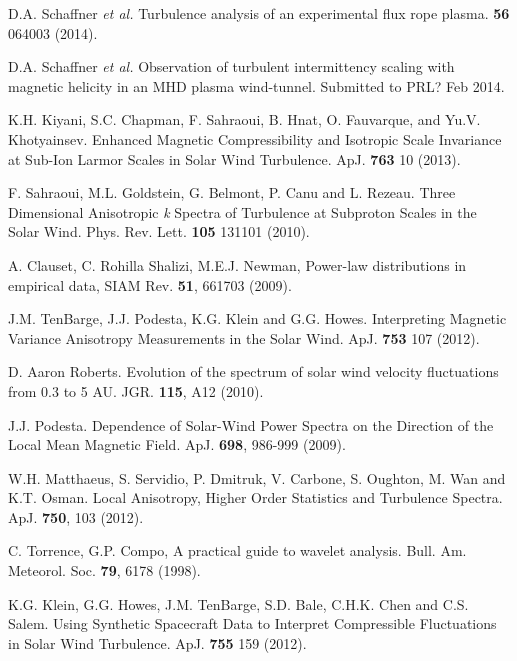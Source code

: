\documentclass[aip,prl,amsmath,amssymb,reprint,superscriptaddress]{revtex4-1} %
\begin{document}
\begin{thebibliography}{99}
 D.A. Schaffner {\it et al.} Turbulence analysis of an experimental flux rope plasma. {\bf 56} 064003 (2014).

 D.A. Schaffner {\it et al.} Observation of turbulent intermittency scaling with magnetic helicity in an MHD plasma wind-tunnel. Submitted to PRL? Feb 2014.

 K.H. Kiyani, S.C. Chapman, F. Sahraoui, B. Hnat, O. Fauvarque, and Yu.V. Khotyainsev. Enhanced Magnetic Compressibility and Isotropic Scale Invariance at Sub-Ion Larmor Scales in Solar Wind Turbulence. ApJ. {\bf 763} 10 (2013).

 F. Sahraoui, M.L. Goldstein, G. Belmont, P. Canu and L. Rezeau. Three Dimensional Anisotropic {\it k} Spectra of Turbulence at Subproton Scales in the Solar Wind. Phys. Rev. Lett. {\bf 105} 131101 (2010).

A. Clauset, C. Rohilla Shalizi, M.E.J. Newman, Power-law distributions in empirical data, SIAM Rev. {\bf 51}, 661703 (2009).

 J.M. TenBarge, J.J. Podesta, K.G. Klein and G.G. Howes. Interpreting Magnetic Variance Anisotropy Measurements in the Solar Wind. ApJ. {\bf 753} 107 (2012).

D. Aaron Roberts. Evolution of the spectrum of solar wind velocity fluctuations from 0.3 to 5 AU. JGR. {\bf 115}, A12 (2010).

J.J. Podesta. Dependence of Solar-Wind Power Spectra on the Direction of the Local Mean Magnetic Field. ApJ. {\bf 698}, 986-999 (2009).

W.H. Matthaeus, S. Servidio, P. Dmitruk, V. Carbone, S. Oughton, M. Wan and K.T. Osman. Local Anisotropy, Higher Order Statistics and Turbulence Spectra. ApJ. {\bf 750}, 103 (2012).

C. Torrence, G.P. Compo, A practical guide to wavelet analysis. Bull. Am. Meteorol. Soc. {\bf 79}, 6178 (1998).

 K.G. Klein, G.G. Howes, J.M. TenBarge, S.D. Bale, C.H.K. Chen and C.S. Salem. Using Synthetic Spacecraft Data to Interpret Compressible Fluctuations in Solar Wind Turbulence. ApJ. {\bf 755} 159 (2012).



\end{thebibliography}
\end{document}
